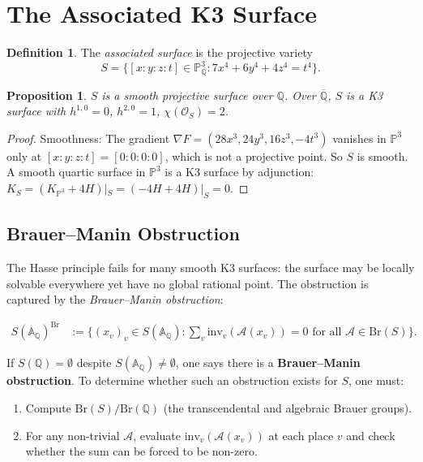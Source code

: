 \documentclass[12pt, a4paper]{article}
\newtheorem{proposition}[theorem]{Proposition}
\theoremstyle{definition}
\newtheorem{definition}[theorem]{Definition}
\begin{document}
\section{The Associated K3 Surface}

\begin{definition}
  The \emph{associated surface} is the projective variety
  \[
    S = \{[x:y:z:t] \in \mathbb{P}^3_\mathbb{Q} : 7x^4 + 6y^4 + 4z^4 = t^4\}.
  \]
\end{definition}

\begin{proposition}
  $S$ is a smooth projective surface over $\mathbb{Q}$.  Over $\overline{\mathbb{Q}}$,
  $S$ is a K3 surface with $h^{1,0}=0$, $h^{2,0}=1$, $\chi(\mathcal{O}_S)=2$.
\end{proposition}

\begin{proof}
  Smoothness: The gradient $\nabla F = (28x^3, 24y^3, 16z^3, -4t^3)$ vanishes
  in $\mathbb{P}^3$ only at $[x:y:z:t]=[0:0:0:0]$, which is not a projective point.
  So $S$ is smooth.  A smooth quartic surface in $\mathbb{P}^3$ is a K3 surface
  by adjunction: $K_S = (K_{\mathbb{P}^3} + 4H)|_S = (-4H+4H)|_S = 0$.
\end{proof}

\subsection*{Brauer--Manin Obstruction}

The Hasse principle fails for many smooth K3 surfaces: the surface may be
locally solvable everywhere yet have no global rational point.  The obstruction
is captured by the \emph{Brauer--Manin obstruction}:

\begin{align*}
  S(\mathbb{A}_\mathbb{Q})^{\mathrm{Br}} &:= \big\{
    (x_v)_v \in S(\mathbb{A}_\mathbb{Q}) : \sum_v \mathrm{inv}_v(\mathcal{A}(x_v)) = 0
    \text{ for all } \mathcal{A} \in \mathrm{Br}(S)
  \big\}.
\end{align*}

If $S(\mathbb{Q}) = \emptyset$ despite $S(\mathbb{A}_\mathbb{Q}) \neq \emptyset$, one
says there is a \textbf{Brauer--Manin obstruction}.  To determine whether such an
obstruction exists for $S$, one must:
\begin{enumerate}
  \item Compute $\mathrm{Br}(S)/\mathrm{Br}(\mathbb{Q})$ (the transcendental and algebraic
        Brauer groups).
  \item For any non-trivial $\mathcal{A}$, evaluate $\mathrm{inv}_v(\mathcal{A}(x_v))$ at
        each place $v$ and check whether the sum can be forced to be non-zero.
\end{enumerate}
\end{document}

